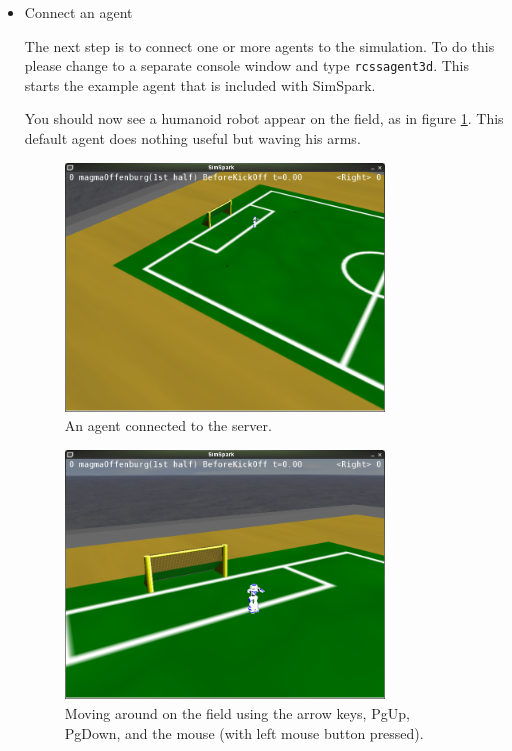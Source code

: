 \begin{itemize}
\item{Connect an agent}

The next step is to connect one or more agents to the simulation. To
do this please change to a separate console window and type \texttt{rcssagent3d}.
This starts the example agent that is included with SimSpark. 

You should now see a humanoid robot appear on the field, as in figure
\ref{fig:agentconnect}. This default agent does nothing useful but waving his arms.

\begin{figure}[htbp]
\begin{center}
\includegraphics[width=0.8\textwidth]{fig/agentconnect}
\caption{An agent connected to the server.}
\label{fig:agentconnect}
\end{center}
\end{figure}

\begin{figure}[htbp]
\begin{center}
\includegraphics[width=0.8\textwidth]{fig/movearound}
\caption{Moving around on the field using the arrow keys, PgUp, PgDown, and the mouse (with left mouse button pressed).}
\label{fig:movearound}
\end{center}
\end{figure}



\end{itemize}
